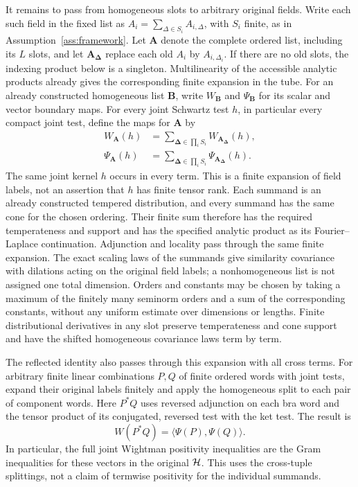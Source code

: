 It remains to pass from homogeneous slots to arbitrary original
fields.  Write each such field in the fixed list as
$A_i=\sum_{\Delta\in S_i}A_{i,\Delta}$, with $S_i$ finite, as in
Assumption~\ref{ass:framework}.  Let $\mathbf A$ denote the complete
ordered list, including its $L$ slots, and let
$\mathbf A_{\boldsymbol\Delta}$ replace each old $A_i$ by
$A_{i,\Delta_i}$.  If there are no old slots, the indexing product
below is a singleton.  Multilinearity of the accessible analytic
products already gives the corresponding finite expansion in the
tube.  For an already constructed homogeneous list $\mathbf B$,
write $W_{\mathbf B}$ and $\Psi_{\mathbf B}$ for its scalar and vector
boundary maps.  For every joint Schwartz test $h$, in particular
every compact joint test, define the maps for $\mathbf A$ by
\begin{equation}\label{R:finite-field-expansion}
 \begin{split}
 W_{\mathbf A}(h)
   &=\sum_{\boldsymbol\Delta\in\prod_i S_i}
                 W_{\mathbf A_{\boldsymbol\Delta}}(h),\\
 \Psi_{\mathbf A}(h)
   &=\sum_{\boldsymbol\Delta\in\prod_i S_i}
                 \Psi_{\mathbf A_{\boldsymbol\Delta}}(h).
 \end{split}
\end{equation}
The same joint kernel $h$ occurs in every term.  This is a finite
expansion of field labels, not an assertion that $h$ has finite tensor
rank.  Each summand is an already constructed tempered distribution,
and every summand has the same cone for the chosen ordering.  Their
finite sum therefore has the required temperateness and support and
has the specified analytic product as its Fourier--Laplace continuation.
Adjunction and locality pass through the same finite expansion.
The exact scaling laws of the summands give similarity covariance with
dilations acting on the original field labels; a nonhomogeneous list
is not assigned one total dimension.  Orders and constants may be
chosen by taking a maximum of the finitely many seminorm orders and
a sum of the corresponding constants, without any uniform estimate
over dimensions or lengths.  Finite distributional derivatives in
any slot preserve temperateness and cone support and have the shifted
homogeneous covariance laws term by term.

The reflected identity also passes through this expansion with all
cross terms.  For arbitrary finite linear combinations $P,Q$ of
finite ordered words with joint tests, expand their original labels
finitely and apply the homogeneous split to
each pair of component words.  Here $P^*Q$ uses reversed adjunction
on each bra word and the tensor product of its conjugated, reversed
test with the ket test.  The result is
\begin{equation}\label{R:reflected-polynomials}
 W(P^*Q)=\langle\Psi(P),\Psi(Q)\rangle.
\end{equation}
In particular, the full joint Wightman positivity inequalities are
the Gram inequalities for these vectors in the original $\mathcal H$.
This uses the cross-tuple splittings, not a claim of termwise
positivity for the individual summands.

